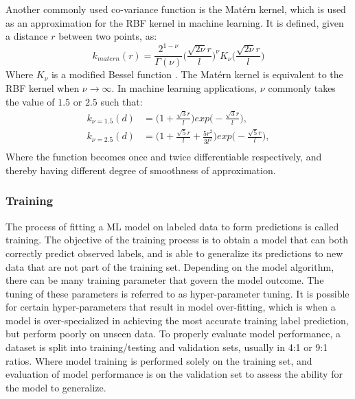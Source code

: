 Another commonly used co-variance function is the Mat\'{e}rn kernel, which is used as an approximation for the RBF kernel in machine learning. It is defined, given a distance $r$ between two points, as:
\begin{equation}
k_{matern}(r) = \frac{2^{1-\nu}}{\Gamma(\nu)}\bigg(\frac{\sqrt{2\nu}r}{l}\bigg)^{\nu}K_{\nu}\bigg(\frac{\sqrt{2\nu}r}{l}\bigg)
\end{equation}
Where $K_\nu$ is a modified Bessel function \cite{rasmussen2006gaussian}. The Mat\'{e}rn kernel is equivalent to the RBF kernel when $\nu\rightarrow\infty$. In machine learning applications, $\nu$ commonly takes the value of $1.5$ or $2.5$ such that:
\begin{equation}
\begin{split}
k_{\nu=1.5}(d) &= \bigg(1+\frac{\sqrt{3}r}{l}\bigg)exp\bigg(-\frac{\sqrt{3}r}{l}\bigg), \\
k_{\nu=2.5}(d) &= \bigg(1+\frac{\sqrt{5}r}{l}+\frac{5r^2}{3l^2}\bigg)exp\bigg(-\frac{\sqrt{5}r}{l}\bigg), \\
\end{split}
\end{equation}
Where the function becomes once and twice differentiable respectively, and thereby having different degree of smoothness of approximation. 
 
\subsubsection{Training}
The process of fitting a ML model on labeled data to form predictions is called training. The objective of the training process is to obtain a model that can both correctly predict observed labels, and is able to generalize its predictions to new data that are not part of the training set. Depending on the model algorithm, there can be many training parameter that govern the model outcome. The tuning of these parameters is referred to as hyper-parameter tuning. It is possible for certain hyper-parameters that result in model over-fitting, which is when a model is over-specialized in achieving the most accurate training label prediction, but perform poorly on unseen data. To properly evaluate model performance, a dataset is split into training/testing and validation sets, usually in 4:1 or 9:1 ratios. Where model training is performed solely on the training set, and evaluation of model performance is on the validation set to assess the ability for the model to generalize.


